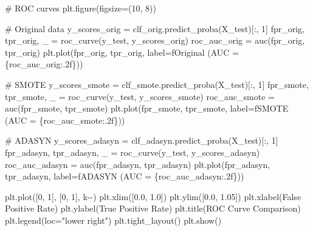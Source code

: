 \documentclass[
  letterpaper,
  DIV=11,
  numbers=noendperiod]{scrreprt}
\newenvironment{Shaded}{\begin{snugshade}}{\end{snugshade}}
\newcommand{\CommentTok}[1]{\textcolor[rgb]{0.37,0.37,0.37}{#1}}
\newcommand{\DecValTok}[1]{\textcolor[rgb]{0.68,0.00,0.00}{#1}}
\newcommand{\FloatTok}[1]{\textcolor[rgb]{0.68,0.00,0.00}{#1}}
\newcommand{\NormalTok}[1]{\textcolor[rgb]{0.00,0.23,0.31}{#1}}
\newcommand{\OperatorTok}[1]{\textcolor[rgb]{0.37,0.37,0.37}{#1}}
\newcommand{\SpecialCharTok}[1]{\textcolor[rgb]{0.37,0.37,0.37}{#1}}
\newcommand{\SpecialStringTok}[1]{\textcolor[rgb]{0.13,0.47,0.30}{#1}}
\newcommand{\StringTok}[1]{\textcolor[rgb]{0.13,0.47,0.30}{#1}}
\begin{document}
\begin{Shaded}
\begin{Highlighting}[]
\CommentTok{\# ROC curves}
\NormalTok{plt.figure(figsize}\OperatorTok{=}\NormalTok{(}\DecValTok{10}\NormalTok{, }\DecValTok{8}\NormalTok{))}

\CommentTok{\# Original data}
\NormalTok{y\_scores\_orig }\OperatorTok{=}\NormalTok{ clf\_orig.predict\_proba(X\_test)[:, }\DecValTok{1}\NormalTok{]}
\NormalTok{fpr\_orig, tpr\_orig, \_ }\OperatorTok{=}\NormalTok{ roc\_curve(y\_test, y\_scores\_orig)}
\NormalTok{roc\_auc\_orig }\OperatorTok{=}\NormalTok{ auc(fpr\_orig, tpr\_orig)}
\NormalTok{plt.plot(fpr\_orig, tpr\_orig, label}\OperatorTok{=}\SpecialStringTok{f\textquotesingle{}Original (AUC = }\SpecialCharTok{\{}\NormalTok{roc\_auc\_orig}\SpecialCharTok{:.2f\}}\SpecialStringTok{)\textquotesingle{}}\NormalTok{)}

\CommentTok{\# SMOTE}
\NormalTok{y\_scores\_smote }\OperatorTok{=}\NormalTok{ clf\_smote.predict\_proba(X\_test)[:, }\DecValTok{1}\NormalTok{]}
\NormalTok{fpr\_smote, tpr\_smote, \_ }\OperatorTok{=}\NormalTok{ roc\_curve(y\_test, y\_scores\_smote)}
\NormalTok{roc\_auc\_smote }\OperatorTok{=}\NormalTok{ auc(fpr\_smote, tpr\_smote)}
\NormalTok{plt.plot(fpr\_smote, tpr\_smote, label}\OperatorTok{=}\SpecialStringTok{f\textquotesingle{}SMOTE (AUC = }\SpecialCharTok{\{}\NormalTok{roc\_auc\_smote}\SpecialCharTok{:.2f\}}\SpecialStringTok{)\textquotesingle{}}\NormalTok{)}

\CommentTok{\# ADASYN}
\NormalTok{y\_scores\_adasyn }\OperatorTok{=}\NormalTok{ clf\_adasyn.predict\_proba(X\_test)[:, }\DecValTok{1}\NormalTok{]}
\NormalTok{fpr\_adasyn, tpr\_adasyn, \_ }\OperatorTok{=}\NormalTok{ roc\_curve(y\_test, y\_scores\_adasyn)}
\NormalTok{roc\_auc\_adasyn }\OperatorTok{=}\NormalTok{ auc(fpr\_adasyn, tpr\_adasyn)}
\NormalTok{plt.plot(fpr\_adasyn, tpr\_adasyn, label}\OperatorTok{=}\SpecialStringTok{f\textquotesingle{}ADASYN (AUC = }\SpecialCharTok{\{}\NormalTok{roc\_auc\_adasyn}\SpecialCharTok{:.2f\}}\SpecialStringTok{)\textquotesingle{}}\NormalTok{)}

\NormalTok{plt.plot([}\DecValTok{0}\NormalTok{, }\DecValTok{1}\NormalTok{], [}\DecValTok{0}\NormalTok{, }\DecValTok{1}\NormalTok{], }\StringTok{\textquotesingle{}k{-}{-}\textquotesingle{}}\NormalTok{)}
\NormalTok{plt.xlim([}\FloatTok{0.0}\NormalTok{, }\FloatTok{1.0}\NormalTok{])}
\NormalTok{plt.ylim([}\FloatTok{0.0}\NormalTok{, }\FloatTok{1.05}\NormalTok{])}
\NormalTok{plt.xlabel(}\StringTok{\textquotesingle{}False Positive Rate\textquotesingle{}}\NormalTok{)}
\NormalTok{plt.ylabel(}\StringTok{\textquotesingle{}True Positive Rate\textquotesingle{}}\NormalTok{)}
\NormalTok{plt.title(}\StringTok{\textquotesingle{}ROC Curve Comparison\textquotesingle{}}\NormalTok{)}
\NormalTok{plt.legend(loc}\OperatorTok{=}\StringTok{"lower right"}\NormalTok{)}
\NormalTok{plt.tight\_layout()}
\NormalTok{plt.show()}
\end{Highlighting}
\end{Shaded}
\end{document}
